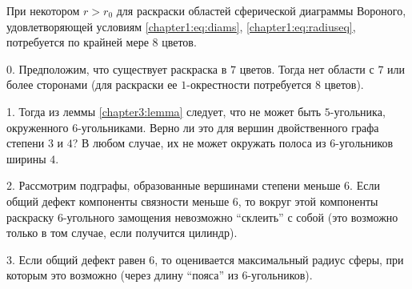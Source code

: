 \begin{theorem}
При некотором $r>r_0$ для раскраски областей сферической диаграммы Вороного,
удовлетворяющей условиям \ref{chapter1:eq:diams}, \ref{chapter1:eq:radiuseq}, 
потребуется по крайней мере $8$ цветов.
\end{theorem}

\begin{myproof}
0. Предположим, что существует раскраска в $7$ цветов. Тогда нет области с $7$ или более сторонами (для раскраски ее $1$-окрестности потребуется $8$ цветов).

1. Тогда из леммы \ref{chapter3:lemma} следует, что не может быть $5$-угольника, окруженного $6$-угольниками. Верно ли это для вершин двойственного графа степени $3$ и $4$? В любом случае, их не может окружать полоса из $6$-угольников ширины $4$.

2. Рассмотрим подграфы, образованные вершинами степени меньше $6$. Если общий дефект компоненты связности меньше $6$, то вокруг этой компоненты раскраску $6$-угольного замощения невозможно \enquote{склеить} с собой (это возможно только в том случае, если получится цилиндр).

3. Если общий дефект равен $6$, то оценивается максимальный радиус сферы, при которым это возможно (через длину \enquote{пояса} из $6$-угольников).
\end{myproof}